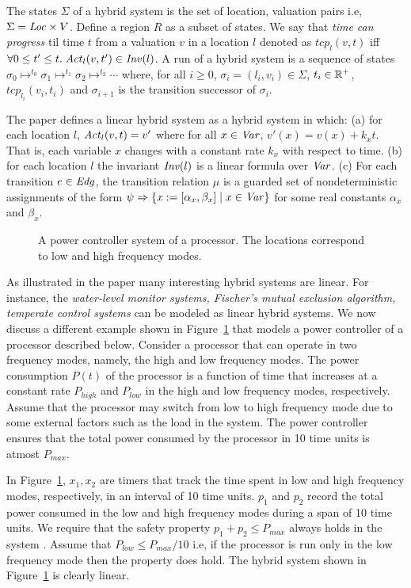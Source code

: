 The states $\Sigma$ of a hybrid system is the set of location, valuation pairs i.e, $\Sigma = \mathit{Loc} \times V$.
Define a region $R$ as a subset of states.
We say that \emph{time can progress} til time $t$ from a valuation $v$ in a location $l$ denoted as 
$tcp_l(v,t)$ iff $\forall 0 \le t' \le t. \; \mathit{Act}_l(v,t') \in \mathit{Inv}(l)$.
A run of a hybrid system is a sequence of states $\sigma_0 \mapsto^{t_0} \sigma_1 \mapsto^{t_1} \sigma_2 \mapsto^{t_2} \cdots$ 
where, for all $i \ge 0$, $\sigma_i = (l_i,v_i) \in \Sigma$, $t_i \in \mathbb{R}^+$,
$tcp_{l_i}(v_i,t_i)$ and
$\sigma_{i+1}$ is the transition successor of $\sigma_i$.

The paper defines a linear hybrid system as a hybrid system in which:
(a) for each location $l$, $\mathit{Act}_l(v,t) = v'$ where for all $x \in \mathit{Var}$, $v'(x) = v(x) + k_x t$. That is, each variable $x$ changes with a constant rate $k_x$ with respect to time.
(b) for each location $l$ the invariant $\mathit{Inv}(l)$ is a linear formula over $\mathit{Var}$.
(c) For each transition $e \in \mathit{Edg}$, the transition relation $\mu$ is a guarded set of nondeterministic assignments of the form $\psi \Rightarrow \{ x := [\alpha_x,\beta_x] \; | \; x \in \mathit{Var} \}$ for some real constants $\alpha_x$ and $\beta_x$.

\begin{figure}

\caption{A power controller system of a processor.  
The locations correspond to low and high frequency modes.} \label{fig:hsys}
\end{figure}

As illustrated in the paper many interesting hybrid systems are linear. For instance, the \textit{water-level monitor systems, Fischer's mutual exclusion algorithm, temperate control systems} can be modeled as linear hybrid systems. 
We now discuss a different example shown in  Figure~\ref{fig:hsys} that models a power controller 
of a processor described below.
Consider a processor that can operate in two frequency modes, namely, the high and low frequency modes.
The power consumption $P(t)$ of the processor is a function of time that increases at a constant rate $P_{high}$ and
$P_{low}$ in the high and low frequency modes, respectively. 
Assume that the processor may switch from low to high frequency mode due to some external factors such as the load in the 
system. The power controller ensures that the total power consumed by the processor in 10 time units is atmost $P_{max}$. 

In Figure~\ref{fig:hsys}, $x_1, x_2$ are timers that track the time spent in low and high frequency modes, respectively, in an interval of 10 time units.
$p_1$ and $p_2$ record the total power consumed in the low and high frequency modes during a span of 10 time units.
We require that the safety property $p_1 + p_2 \le P_{max}$ always holds in the system .
Assume that $P_{low} \le P_{max}/10$ i.e, if the processor is run only in the low frequency mode then the property does hold.
The hybrid system shown in Figure~\ref{fig:hsys} is clearly linear.

